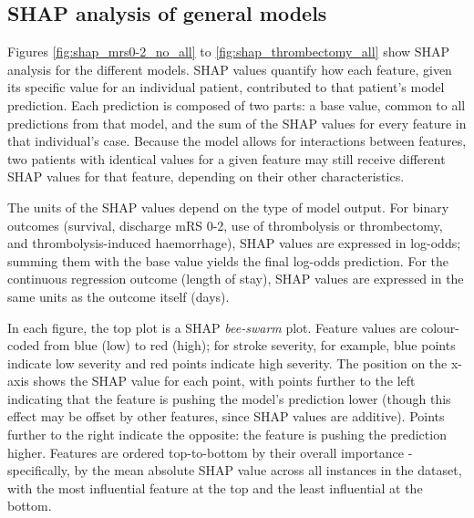 \subsection{SHAP analysis of general models}

Figures \ref{fig:shap_mrs0-2_no_all} to \ref{fig:shap_thrombectomy_all} show SHAP analysis for the different models. SHAP values quantify how each feature, given its specific value for an individual patient, contributed to that patient's model prediction. Each prediction is composed of two parts: a base value, common to all predictions from that model, and the sum of the SHAP values for every feature in that individual's case. Because the model allows for interactions between features, two patients with identical values for a given feature may still receive different SHAP values for that feature, depending on their other characteristics.

The units of the SHAP values depend on the type of model output. For binary outcomes (survival, discharge mRS 0-2, use of thrombolysis or thrombectomy, and thrombolysis-induced haemorrhage), SHAP values are expressed in log-odds; summing them with the base value yields the final log-odds prediction. For the continuous regression outcome (length of stay), SHAP values are expressed in the same units as the outcome itself (days).

In each figure, the top plot is a SHAP \textit{bee-swarm} plot. Feature values are colour-coded from blue (low) to red (high); for stroke severity, for example, blue points indicate low severity and red points indicate high severity. The position on the x-axis shows the SHAP value for each point, with points further to the left indicating that the feature is pushing the model's prediction lower (though this effect may be offset by other features, since SHAP values are additive). Points further to the right indicate the opposite: the feature is pushing the prediction higher. Features are ordered top-to-bottom by their overall importance - specifically, by the mean absolute SHAP value across all instances in the dataset, with the most influential feature at the top and the least influential at the bottom.

